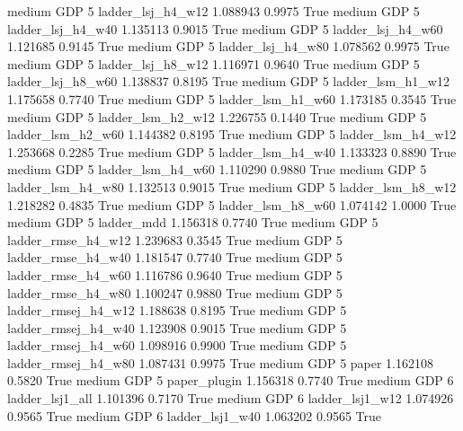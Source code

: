     medium      GDP                 5   ladder_lsj_h4_w12   1.088943      0.9975    True
    medium      GDP                 5   ladder_lsj_h4_w40   1.135113      0.9015    True
    medium      GDP                 5   ladder_lsj_h4_w60   1.121685      0.9145    True
    medium      GDP                 5   ladder_lsj_h4_w80   1.078562      0.9975    True
    medium      GDP                 5   ladder_lsj_h8_w12   1.116971      0.9640    True
    medium      GDP                 5   ladder_lsj_h8_w60   1.138837      0.8195    True
    medium      GDP                 5   ladder_lsm_h1_w12   1.175658      0.7740    True
    medium      GDP                 5   ladder_lsm_h1_w60   1.173185      0.3545    True
    medium      GDP                 5   ladder_lsm_h2_w12   1.226755      0.1440    True
    medium      GDP                 5   ladder_lsm_h2_w60   1.144382      0.8195    True
    medium      GDP                 5   ladder_lsm_h4_w12   1.253668      0.2285    True
    medium      GDP                 5   ladder_lsm_h4_w40   1.133323      0.8890    True
    medium      GDP                 5   ladder_lsm_h4_w60   1.110290      0.9880    True
    medium      GDP                 5   ladder_lsm_h4_w80   1.132513      0.9015    True
    medium      GDP                 5   ladder_lsm_h8_w12   1.218282      0.4835    True
    medium      GDP                 5   ladder_lsm_h8_w60   1.074142      1.0000    True
    medium      GDP                 5          ladder_mdd   1.156318      0.7740    True
    medium      GDP                 5  ladder_rmse_h4_w12   1.239683      0.3545    True
    medium      GDP                 5  ladder_rmse_h4_w40   1.181547      0.7740    True
    medium      GDP                 5  ladder_rmse_h4_w60   1.116786      0.9640    True
    medium      GDP                 5  ladder_rmse_h4_w80   1.100247      0.9880    True
    medium      GDP                 5 ladder_rmsej_h4_w12   1.188638      0.8195    True
    medium      GDP                 5 ladder_rmsej_h4_w40   1.123908      0.9015    True
    medium      GDP                 5 ladder_rmsej_h4_w60   1.098916      0.9900    True
    medium      GDP                 5 ladder_rmsej_h4_w80   1.087431      0.9975    True
    medium      GDP                 5               paper   1.162108      0.5820    True
    medium      GDP                 5        paper_plugin   1.156318      0.7740    True
    medium      GDP                 6     ladder_lsj1_all   1.101396      0.7170    True
    medium      GDP                 6     ladder_lsj1_w12   1.074926      0.9565    True
    medium      GDP                 6     ladder_lsj1_w40   1.063202      0.9565    True

